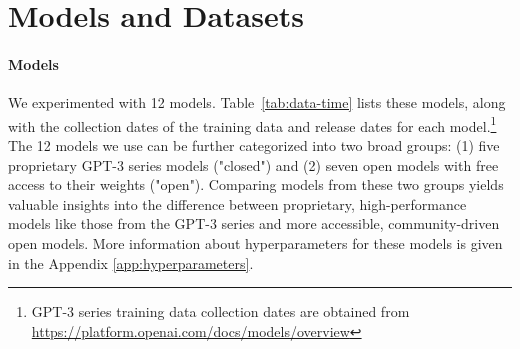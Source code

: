 \documentclass[letterpaper]{article} %
\newcommand{\jmf}[1]{}      %
\begin{document}
\section{Models and Datasets}

\paragraph{Models}
\jmf{todo}
We experimented with 12 models. Table~\ref{tab:data-time} lists these models, along with the collection dates of the training data and release dates for each model.\footnote{GPT-3 series training data collection dates are obtained from \url{https://platform.openai.com/docs/models/overview}} The 12 models we use can be further categorized into two broad groups: (1) five proprietary GPT-3 series models ("closed") and (2) seven open models with free access to their weights ("open"). Comparing models from these two groups yields valuable insights into the difference between proprietary, high-performance models like those from the GPT-3 series and more accessible, community-driven open models. More information about hyperparameters for these models is given in the Appendix \ref{app:hyperparameters}.

\end{document}
